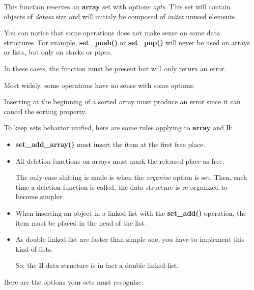 	  {This function reserves an \textbf{array} set with options
	    \textit{opts}. This set will contain objects of \textit{datasz}
	    size and will initialy be composed of \textit{initsz} unused
	    elements.}

You can notice that some operations does not make sense on some data
structures. For example, \textbf{set\_push()} or \textbf{set\_pop()}
will never be used on arrays or lists, but only on stacks or pipes.

In these cases, the function must be present but will only return an error.

Most widely, some operations have no sense with some options.

Inserting at the beginning of a sorted array must produce an error
since it can cancel the sorting property.

To keep sets behavior unified, here are some rules applying to
\textbf{array} and \textbf{ll}:

\begin{itemize}
  \item
    \textbf{set\_add\_array()} must insert the item at the first free place.
  \item
    All deletion functions on arrays must mark the released place as
    free.

    The only case shifting is made is when the \textit{organise} option
    is set. Then, each time a deletion function is called, the data structure
    is re-organized to become simpler.
  \item
    When inserting an object in a linked-list with the \textbf{set\_add()}
    operation, the item must be placed in the head of the list.
  \item
    As double linked-list are faster than simple one, you have to
    implement this kind of lists.

    So, the \textbf{ll} data structure is in fact a double linked-list.
\end{itemize}

Here are the options your sets must recognize:

